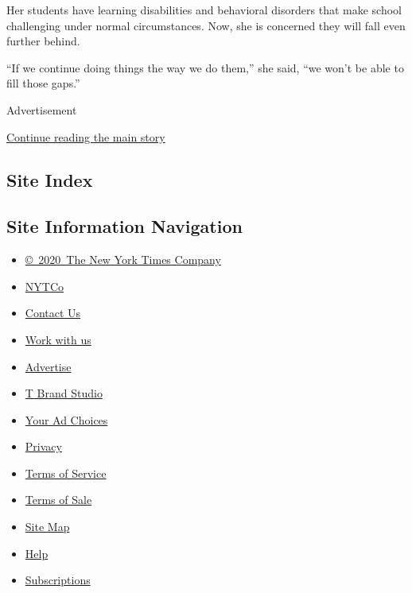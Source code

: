 Her students have learning disabilities and behavioral disorders that
make school challenging under normal circumstances. Now, she is
concerned they will fall even further behind.

``If we continue doing things the way we do them,'' she said, ``we won't
be able to fill those gaps.''

Advertisement

\protect\hyperlink{after-bottom}{Continue reading the main story}

\hypertarget{site-index}{%
\subsection{Site Index}\label{site-index}}

\hypertarget{site-information-navigation}{%
\subsection{Site Information
Navigation}\label{site-information-navigation}}

\begin{itemize}
\tightlist
\item
  \href{https://help.nytimes.com/hc/en-us/articles/115014792127-Copyright-notice}{©~2020~The
  New York Times Company}
\end{itemize}

\begin{itemize}
\tightlist
\item
  \href{https://www.nytco.com/}{NYTCo}
\item
  \href{https://help.nytimes.com/hc/en-us/articles/115015385887-Contact-Us}{Contact
  Us}
\item
  \href{https://www.nytco.com/careers/}{Work with us}
\item
  \href{https://nytmediakit.com/}{Advertise}
\item
  \href{http://www.tbrandstudio.com/}{T Brand Studio}
\item
  \href{https://www.nytimes.com/privacy/cookie-policy\#how-do-i-manage-trackers}{Your
  Ad Choices}
\item
  \href{https://www.nytimes.com/privacy}{Privacy}
\item
  \href{https://help.nytimes.com/hc/en-us/articles/115014893428-Terms-of-service}{Terms
  of Service}
\item
  \href{https://help.nytimes.com/hc/en-us/articles/115014893968-Terms-of-sale}{Terms
  of Sale}
\item
  \href{https://spiderbites.nytimes.com}{Site Map}
\item
  \href{https://help.nytimes.com/hc/en-us}{Help}
\item
  \href{https://www.nytimes.com/subscription?campaignId=37WXW}{Subscriptions}
\end{itemize}

